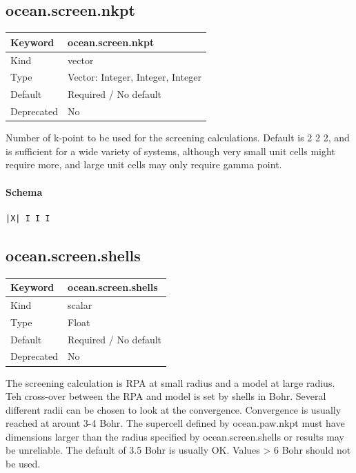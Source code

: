 \documentclass[11pt]{article}
\begin{document}
{{{{{\subsection{ocean.screen.nkpt}
\label{kw:ocean-screen-nkpt}
\begin{longtable}{|p{1.5in}|p{4.5in}|}
\hline
Keyword & ocean.screen.nkpt \\
\hline
Kind & vector \\
\hline
Type & Vector: Integer, Integer, Integer \\
\hline
Default & Required / No default \\
\hline
Deprecated & No \\
\hline
\end{longtable}
 Number of k-point to be used for the screening calculations. Default is 2 2 2,
 and is sufficient for a wide variety of systems, although very small unit
 cells might require more, and large unit cells may only require gamma point.

\paragraph{Schema}
\begin{Verbatim}
|X| I I I
\end{Verbatim}

\subsection{ocean.screen.shells}
\label{kw:ocean-screen-shells}
\begin{longtable}{|p{1.5in}|p{4.5in}|}
\hline
Keyword & ocean.screen.shells \\
\hline
Kind & scalar \\
\hline
Type & Float \\
\hline
Default & Required / No default \\
\hline
Deprecated & No \\
\hline
\end{longtable}
 The screening calculation is RPA at small radius and a model at large radius.
 Teh cross-over between the RPA and model is set by shells in Bohr.
 Several different radii can be chosen to look at the convergence.
 Convergence is usually reached at arount 3-4 Bohr. The supercell defined by
 ocean.paw.nkpt must have dimensions larger than the radius specified by
 ocean.screen.shells or results may be unreliable. The default of 3.5 Bohr is
 usually OK. Values > 6 Bohr should not be used.

}}}}}
\end{document}
